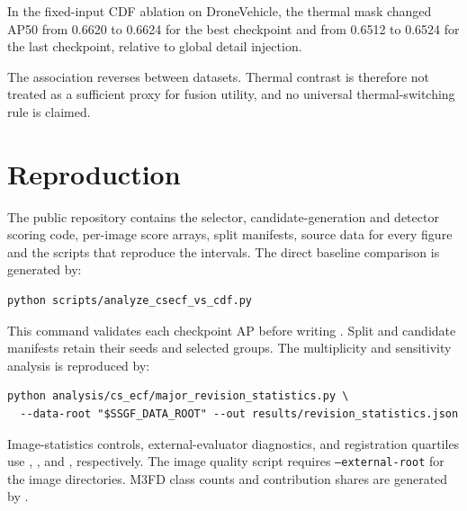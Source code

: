 \documentclass[11pt]{article}
\begin{document}
\noindent In the fixed-input CDF ablation on DroneVehicle, the thermal mask
changed AP50 from 0.6620 to 0.6624 for the best checkpoint and from 0.6512 to
0.6524 for the last checkpoint, relative to global detail injection.

The association reverses between datasets. Thermal contrast is therefore not
treated as a sufficient proxy for fusion utility, and no universal
thermal-switching rule is claimed.

\small
\section{Reproduction}

The public repository contains the selector, candidate-generation and detector
scoring code, per-image score arrays, split manifests, source data for every
figure and the scripts that reproduce the intervals. The direct baseline
comparison is generated by:

\begin{verbatim}
python scripts/analyze_csecf_vs_cdf.py
\end{verbatim}

This command validates each checkpoint AP before writing
. Split and candidate
manifests retain their seeds and selected groups. The multiplicity and
sensitivity analysis is reproduced by:

\begin{verbatim}
python analysis/cs_ecf/major_revision_statistics.py \
  --data-root "$SSGF_DATA_ROOT" --out results/revision_statistics.json
\end{verbatim}

Image-statistics controls, external-evaluator diagnostics, and registration
quartiles use
,
, and
, respectively. The image
quality script requires \texttt{--external-root} for the image directories.
M3FD class counts and contribution shares are generated by
.
\end{document}

